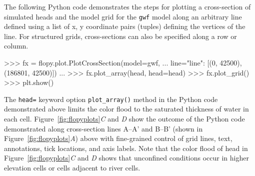 \documentclass[11pt, oneside]{article}  	%
\begin{document}
The following Python code demonstrates the steps for plotting a cross-section of simulated heads and the model grid for the \texttt{gwf} model along an arbitrary line defined using a list of x, y coordinate pairs (tuples) defining the vertices of the line. For structured grids, cross-sections can also be specified along a row or column.

\begin{python}
>>> fx = flopy.plot.PlotCrossSection(model=gwf, 
... line={"line": [(0, 42500), (186801, 42500)]})
...
>>> fx.plot_array(head, head=head)
>>> fx.plot_grid()
>>> plt.show()
\end{python}

\noindent The \texttt{head=} keyword option \texttt{plot\_array()} method in the Python code demonstrated above limits the color flood to the saturated thickness of water in each cell. Figure~\ref{fig:flopyplots}\textit{C} and \textit{D} show the outcome of the Python code demonstrated along cross-section lines A--A' and B--B' (shown in Figure~\ref{fig:flopyplots}\textit{A}) above with fine-grained control of grid lines, text, annotations, tick locations, and axis labels. Note that the color flood of head in Figure~\ref{fig:flopyplots}\textit{C} and \textit{D} shows that unconfined conditions occur in higher elevation cells or cells adjacent to river cells.
\end{document}
